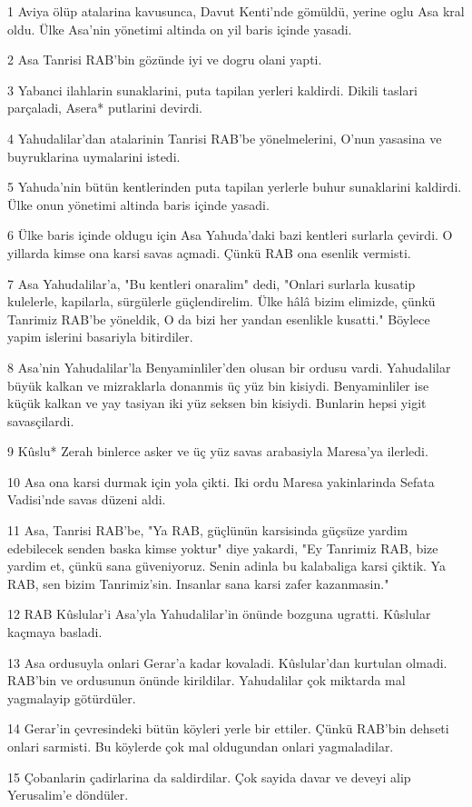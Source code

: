\par 1 Aviya ölüp atalarina kavusunca, Davut Kenti'nde gömüldü, yerine oglu Asa kral oldu. Ülke Asa'nin yönetimi altinda on yil baris içinde yasadi.
\par 2 Asa Tanrisi RAB'bin gözünde iyi ve dogru olani yapti.
\par 3 Yabanci ilahlarin sunaklarini, puta tapilan yerleri kaldirdi. Dikili taslari parçaladi, Asera* putlarini devirdi.
\par 4 Yahudalilar'dan atalarinin Tanrisi RAB'be yönelmelerini, O'nun yasasina ve buyruklarina uymalarini istedi.
\par 5 Yahuda'nin bütün kentlerinden puta tapilan yerlerle buhur sunaklarini kaldirdi. Ülke onun yönetimi altinda baris içinde yasadi.
\par 6 Ülke baris içinde oldugu için Asa Yahuda'daki bazi kentleri surlarla çevirdi. O yillarda kimse ona karsi savas açmadi. Çünkü RAB ona esenlik vermisti.
\par 7 Asa Yahudalilar'a, "Bu kentleri onaralim" dedi, "Onlari surlarla kusatip kulelerle, kapilarla, sürgülerle güçlendirelim. Ülke hâlâ bizim elimizde, çünkü Tanrimiz RAB'be yöneldik, O da bizi her yandan esenlikle kusatti." Böylece yapim islerini basariyla bitirdiler.
\par 8 Asa'nin Yahudalilar'la Benyaminliler'den olusan bir ordusu vardi. Yahudalilar büyük kalkan ve mizraklarla donanmis üç yüz bin kisiydi. Benyaminliler ise küçük kalkan ve yay tasiyan iki yüz seksen bin kisiydi. Bunlarin hepsi yigit savasçilardi.
\par 9 Kûslu* Zerah binlerce asker ve üç yüz savas arabasiyla Maresa'ya ilerledi.
\par 10 Asa ona karsi durmak için yola çikti. Iki ordu Maresa yakinlarinda Sefata Vadisi'nde savas düzeni aldi.
\par 11 Asa, Tanrisi RAB'be, "Ya RAB, güçlünün karsisinda güçsüze yardim edebilecek senden baska kimse yoktur" diye yakardi, "Ey Tanrimiz RAB, bize yardim et, çünkü sana güveniyoruz. Senin adinla bu kalabaliga karsi çiktik. Ya RAB, sen bizim Tanrimiz'sin. Insanlar sana karsi zafer kazanmasin."
\par 12 RAB Kûslular'i Asa'yla Yahudalilar'in önünde bozguna ugratti. Kûslular kaçmaya basladi.
\par 13 Asa ordusuyla onlari Gerar'a kadar kovaladi. Kûslular'dan kurtulan olmadi. RAB'bin ve ordusunun önünde kirildilar. Yahudalilar çok miktarda mal yagmalayip götürdüler.
\par 14 Gerar'in çevresindeki bütün köyleri yerle bir ettiler. Çünkü RAB'bin dehseti onlari sarmisti. Bu köylerde çok mal oldugundan onlari yagmaladilar.
\par 15 Çobanlarin çadirlarina da saldirdilar. Çok sayida davar ve deveyi alip Yerusalim'e döndüler.

